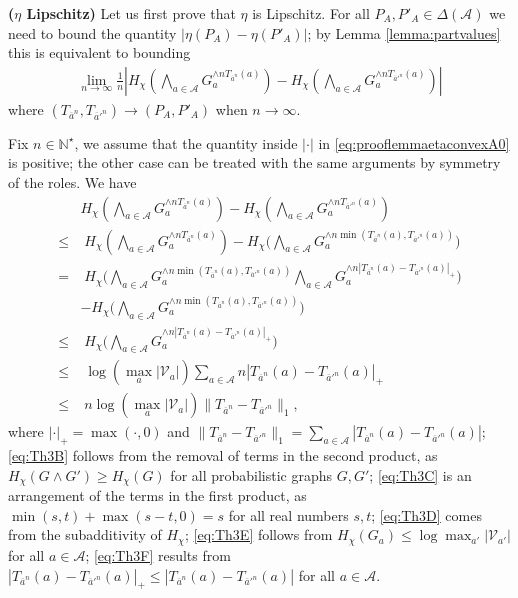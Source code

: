 \documentclass[conference,a4paper]{IEEEtran}
\begin{document}
\textbf{($\eta$ Lipschitz)} Let us first prove that $\eta$ is Lipschitz. For all $P_A, P'_A \in \Delta(\mathcal{A})$ we need to bound the quantity $|\eta(P_A)-\eta(P'_A)|$; by Lemma \ref{lemma:partvalues} this is equivalent to bounding
\begin{align}
     \lim_{n \rightarrow \infty} \frac{1}{n}\left|H_\chi\left(\bigwedge_{a \in \mathcal{A}} G_a^{\wedge n T_{\overline{a}^n} (a)}\right) - H_\chi\left(\bigwedge_{a \in \mathcal{A}} G_a^{\wedge n T_{\overline{a}'^n} (a)}\right)\right|\label{eq:prooflemmaetaconvexA0}
    \end{align}
where $(T_{\overline{a}^n}, T_{\overline{a}'^n}) \rightarrow (P_A, P'_A)$ when $n \rightarrow \infty$.

Fix $n \in \mathbb{N}^\star$, we assume that the quantity inside $|\cdot|$ in \eqref{eq:prooflemmaetaconvexA0} is positive; the other case can be treated with the same arguments by symmetry of the roles. We have
\begin{align}
    & H_\chi\left(\bigwedge_{a \in \mathcal{A}} G_a^{\wedge n T_{\overline{a}^n} (a)}\right) - H_\chi\left(\bigwedge_{a \in \mathcal{A}} G_a^{\wedge n T_{\overline{a}'^n} (a)}\right) \label{eq:Th3A}\\
    \leq & \; H_\chi\left(\bigwedge_{a \in \mathcal{A}} G_a^{\wedge n T_{\overline{a}^n} (a)}\right) - H_\chi\Bigg(\bigwedge_{a \in \mathcal{A}} G_a^{\wedge n \min(T_{\overline{a}^n}(a),T_{\overline{a}'^n}(a))}\! \Bigg) \label{eq:Th3B}\\
    = & \; H_\chi\Bigg(\!\bigwedge_{a \in \mathcal{A}} G_a^{\wedge n \min(T_{\overline{a}^n}(a),T_{\overline{a}'^n}(a))} \bigwedge_{a \in \mathcal{A}} G_a^{\wedge n |T_{\overline{a}^n}(a)-T_{\overline{a}'^n}(a)|_+}\!\!\Bigg) \nonumber\\
    & - H_\chi\Bigg(\bigwedge_{a \in \mathcal{A}} G_a^{\wedge n \min(T_{\overline{a}^n}(a),T_{\overline{a}'^n}(a))} \Bigg) \label{eq:Th3C}\\
    \leq & \; H_\chi\Bigg(\bigwedge_{a \in \mathcal{A}} G_a^{\wedge n |T_{\overline{a}^n}(a)-T_{\overline{a}'^n}(a)|_+}\Bigg) \label{eq:Th3D}\\
    \leq & \; \log\left(\max_a |\mathcal{V}_a|\right) \sum_{a \in \mathcal{A}} n |T_{\overline{a}^n}(a)-T_{\overline{a}'^n}(a)|_+ \label{eq:Th3E}\\
    \leq & \; n \log\left(\max_a |\mathcal{V}_a|\right) \|T_{\overline{a}^n}-T_{\overline{a}'^n}\|_1, \label{eq:Th3F}
\end{align}
where $|\cdot|_+ = \max(\cdot,0)$ and $\|T_{\overline{a}^n}-T_{\overline{a}'^n}\|_1 = \sum_{a \in \mathcal{A}} |T_{\overline{a}^n}(a)-T_{\overline{a}'^n}(a)|$; \eqref{eq:Th3B} follows from the removal of terms in the second product, as $H_\chi(G\wedge G') \geq H_\chi(G)$ for all probabilistic graphs $G,G'$; \eqref{eq:Th3C} is an arrangement of the terms in the first product, as $\min(s,t) + \max(s-t,0) = s$ for all real numbers $s,t$; \eqref{eq:Th3D} comes from the subadditivity of $H_\chi$; \eqref{eq:Th3E} follows from $H_\chi(G_a) \leq \log \max_{a'} |\mathcal{V}_{a'}|$ for all $a \in \mathcal{A}$; \eqref{eq:Th3F} results from $|T_{\overline{a}^n}(a)-T_{\overline{a}'^n}(a)|_+ \leq |T_{\overline{a}^n}(a)-T_{\overline{a}'^n}(a)|$ for all $a\in \mathcal{A}$.
\end{document}
